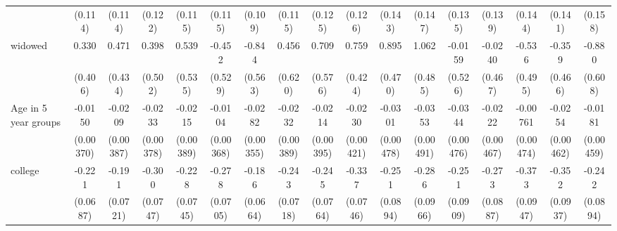 {\begin{tabular}{l*{16}{c}}
                    &     (0.114)         &     (0.114)         &     (0.122)         &     (0.115)         &     (0.115)         &     (0.109)         &     (0.115)         &     (0.125)         &     (0.126)         &     (0.143)         &     (0.147)         &     (0.135)         &     (0.139)         &     (0.144)         &     (0.141)         &     (0.158)         \\
[1em]
widowed             &       0.330         &       0.471         &       0.398         &       0.539         &      -0.452         &      -0.844         &       0.456         &       0.709         &       0.759         &       0.895         &       1.062\sym{*}  &     -0.0159         &     -0.0240         &      -0.536         &      -0.359         &      -0.880         \\
                    &     (0.406)         &     (0.434)         &     (0.502)         &     (0.535)         &     (0.529)         &     (0.563)         &     (0.620)         &     (0.576)         &     (0.424)         &     (0.470)         &     (0.485)         &     (0.526)         &     (0.467)         &     (0.495)         &     (0.466)         &     (0.608)         \\
[1em]
Age in 5 year groups&     -0.0150\sym{***}&     -0.0209\sym{***}&     -0.0233\sym{***}&     -0.0215\sym{***}&     -0.0104\sym{**} &     -0.0282\sym{***}&     -0.0232\sym{***}&     -0.0214\sym{***}&     -0.0230\sym{***}&     -0.0301\sym{***}&     -0.0353\sym{***}&     -0.0344\sym{***}&     -0.0222\sym{***}&    -0.00761         &     -0.0254\sym{***}&     -0.0181\sym{***}\\
                    &   (0.00370)         &   (0.00387)         &   (0.00378)         &   (0.00389)         &   (0.00368)         &   (0.00355)         &   (0.00389)         &   (0.00395)         &   (0.00421)         &   (0.00478)         &   (0.00491)         &   (0.00476)         &   (0.00467)         &   (0.00474)         &   (0.00462)         &   (0.00459)         \\
[1em]
college             &      -0.221\sym{**} &      -0.191\sym{**} &      -0.300\sym{***}&      -0.228\sym{**} &      -0.278\sym{***}&      -0.186\sym{**} &      -0.243\sym{***}&      -0.245\sym{**} &      -0.337\sym{***}&      -0.251\sym{**} &      -0.286\sym{**} &      -0.251\sym{**} &      -0.273\sym{**} &      -0.373\sym{***}&      -0.352\sym{***}&      -0.242\sym{**} \\
                    &    (0.0687)         &    (0.0721)         &    (0.0747)         &    (0.0745)         &    (0.0705)         &    (0.0664)         &    (0.0718)         &    (0.0764)         &    (0.0746)         &    (0.0894)         &    (0.0966)         &    (0.0909)         &    (0.0887)         &    (0.0947)         &    (0.0937)         &    (0.0894)         \\

\end{tabular}}
